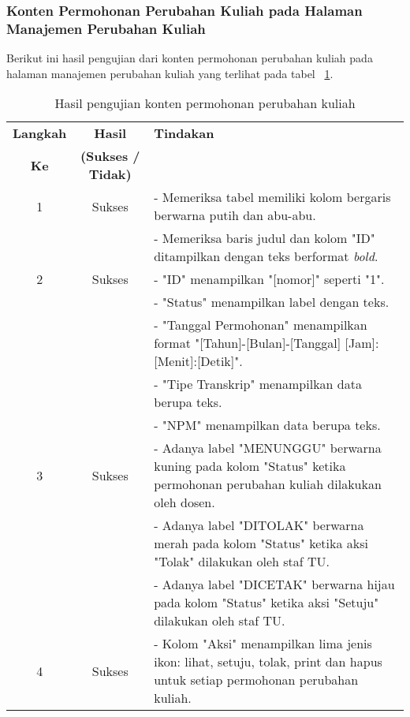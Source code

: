 \subsubsection{Konten Permohonan Perubahan Kuliah pada Halaman Manajemen Perubahan Kuliah}
Berikut ini hasil pengujian dari konten permohonan perubahan kuliah pada halaman manajemen perubahan kuliah yang terlihat pada tabel ~\ref{hasil:ManajemenPermohonanPerubahanKuliah}.
\begin{table}[H]
	\centering 
	\caption{Hasil pengujian konten permohonan perubahan kuliah}
	\label{hasil:ManajemenPermohonanPerubahanKuliah}
	\begin{tabular}{|c| c| p{}|}
		\toprule
		\textbf{Langkah} & \textbf{Hasil} & \textbf{Tindakan}\\
		\textbf{Ke} & \textbf{(Sukses / Tidak)} &\\
		\midrule
		1&Sukses&- Memeriksa tabel memiliki kolom bergaris berwarna putih dan abu-abu.\\
		&& - Memeriksa baris judul dan kolom "ID" ditampilkan dengan teks berformat \textit{bold}.	\\	
		\hline
		2&Sukses&- "ID" menampilkan "[nomor]" seperti "1".\\
		&&- "Status" menampilkan label dengan teks.\\
		&&- "Tanggal Permohonan" menampilkan format "[Tahun]-[Bulan]-[Tanggal] [Jam]:[Menit]:[Detik]".\\
		&&- "Tipe Transkrip" menampilkan data berupa teks.\\
		&&- "NPM" menampilkan data berupa teks.\\
		\hline
		3&Sukses& - Adanya label "MENUNGGU" berwarna kuning  pada kolom "Status" ketika permohonan perubahan kuliah dilakukan oleh dosen.\\
		&& - Adanya label "DITOLAK" berwarna merah pada kolom "Status" ketika aksi "Tolak" dilakukan oleh staf TU.\\
		&& - Adanya label "DICETAK" berwarna hijau pada kolom "Status" ketika aksi "Setuju" dilakukan oleh staf TU.\\
		\hline
		4&Sukses&- Kolom "Aksi" menampilkan lima jenis ikon: lihat, setuju, tolak, print dan hapus untuk setiap permohonan perubahan kuliah.\\		
		\bottomrule		
	\end{tabular} 
\end{table}

